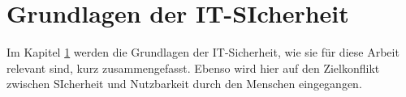 \newpage
\section{Grundlagen der IT-SIcherheit} \label{grundlagen}

Im Kapitel \ref{grundlagen} werden die Grundlagen der IT-Sicherheit, wie sie für diese
Arbeit relevant sind, kurz zusammengefasst. Ebenso wird hier auf den
Zielkonflikt zwischen SIcherheit und Nutzbarkeit durch den Menschen eingegangen.

